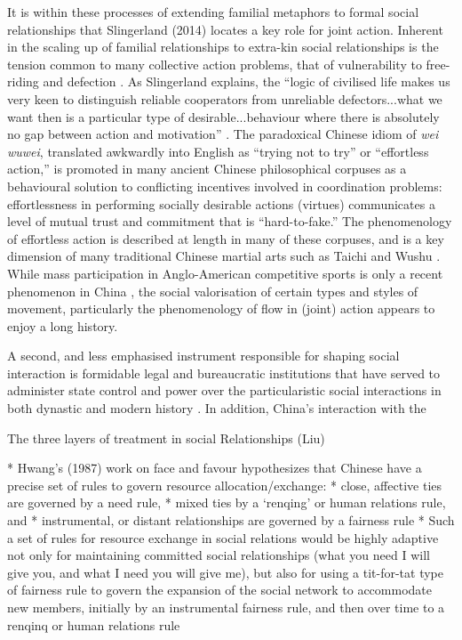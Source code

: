 {%
It is within these processes of extending familial metaphors to formal social relationships that Slingerland (2014) locates a key role for joint action. Inherent in the scaling up of familial relationships to extra-kin social relationships is the tension common to many collective action problems, that of vulnerability to free-riding and defection \citep{Cosmides2013}.
As Slingerland explains, the ``logic of civilised life makes us very keen to distinguish reliable cooperators from unreliable defectors...what we want then is a particular type of desirable...behaviour where there is absolutely no gap between action and motivation'' \citep[192]{Slingerland2014}. The paradoxical Chinese idiom of \textit{wei wuwei}, translated awkwardly into English as ``trying not to try'' or ``effortless action,'' is promoted in many ancient Chinese philosophical corpuses as a behavioural solution to conflicting incentives involved in coordination problems: effortlessness in performing socially desirable actions (virtues) communicates a level of mutual trust and commitment that is ``hard-to-fake.''  The phenomenology of effortless action is described at length in many of these corpuses, and is a key dimension of many traditional Chinese martial arts such as Taichi and Wushu \citep{Morris1998}. While mass participation in Anglo-American competitive sports is only a recent phenomenon in China \citep{Brownell2008}, the social valorisation of certain types and styles of movement, particularly the phenomenology of flow in (joint) action appears to enjoy a long history.


A second, and less emphasised instrument responsible for shaping social interaction is  formidable legal and bureaucratic institutions that have served to administer state control and power over the particularistic social interactions in both dynastic and modern history \citep[]{Liu2017}.  In addition, China's interaction with the

The three layers of treatment in social Relationships (Liu)

* Hwang’s (1987) work on face and favour hypothesizes that Chinese have a precise set of rules to govern resource allocation/exchange:
    * close, affective ties are governed by a need rule,
    * mixed ties by a ‘renqing’ or human relations rule, and
    * instrumental, or distant relationships are governed by a fairness rule
* Such a set of rules for resource exchange in social relations would be highly adaptive not only for maintaining committed social relationships (what you need I will give you, and what I need you will give me), but also for using a tit-for-tat type of fairness rule to govern the expansion of the social network to accommodate new members, initially by an instrumental fairness rule, and then over time to a renqinq or human relations rule

}
